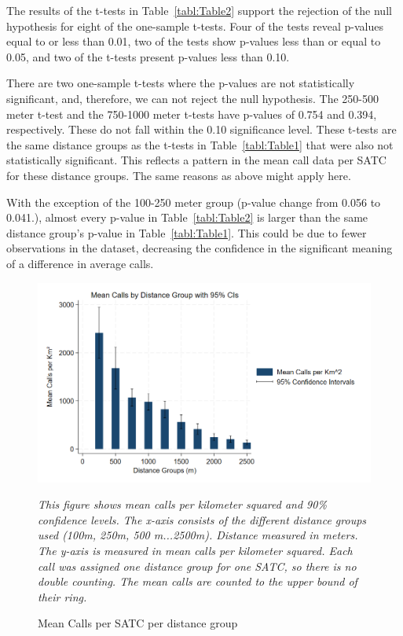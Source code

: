 \documentclass[12pt]{article}
\begin{document}
The results of the t-tests in Table~\ref{tabl:Table2} support the rejection of the null hypothesis for eight of the one-sample t-tests. Four of the tests reveal p-values equal to or less than 0.01, two of the tests show p-values less than or equal to 0.05, and two of the t-tests present p-values less than 0.10. 

There are two one-sample t-tests where the p-values are not statistically significant, and, therefore, we can not reject the null hypothesis. The 250-500 meter t-test and the 750-1000 meter t-tests have p-values of 0.754 and 0.394, respectively. These do not fall within the 0.10 significance level. These t-tests are the same distance groups as the t-tests in Table~\ref{tabl:Table1} that were also not statistically significant. This reflects a pattern in the mean call data per SATC for these distance groups. The same reasons as above might apply here.

With the exception of the 100-250 meter group (p-value change from 0.056 to 0.041.), almost every p-value in Table~\ref{tabl:Table2} is larger than the same distance group's p-value in Table~\ref{tabl:Table1}. This could be due to fewer observations in the dataset, decreasing the confidence in the significant meaning of a difference in average calls. 

\begin{figure}[htbp]
    \centering
\includegraphics[width=0.75\linewidth]{Reproducibility Package/Visual Graphics/CI_Graph.png}
    \caption{Mean Calls per SATC per distance group}
     \label{fig:Figure3}
     \textit{This figure shows mean calls per kilometer squared and 90\% confidence levels. The x-axis consists of the different distance groups used (100m, 250m, 500 m...2500m). Distance measured in meters.}
    \textit{The y-axis is measured in mean calls per kilometer squared. Each call was assigned one distance group for one SATC, so there is no double counting. The mean calls are counted to the upper bound of their ring.}
    \textit{}
\end{figure}
\end{document}
